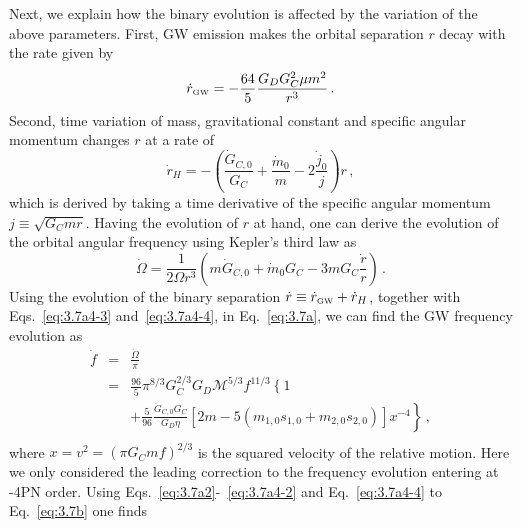 \documentclass[prd,twocolumn,nofootinbib]{revtex4-1}
\newcommand\bw{\begin{widetext}}
\newcommand\ew{\end{widetext}}
\newcommand{\GW}{{\mbox{\tiny GW}}}
\begin{document}
Next, we explain how the binary evolution is affected by the variation of the above parameters. 
First, GW emission makes the orbital separation $r$ decay with the rate given by~\cite{PhysRevD.49.2658}
 \begin{equation}
 \dot{r}_{\GW}=-\frac{64}{5}\frac{G_D G_C^2 \mu m^2}{r^3}\,.
 \end{equation}
Second, time variation of mass, gravitational constant and specific angular momentum changes $r$ at a rate of
 \begin{equation}
 \dot{r}_H=-\left(\frac{\dot{G}_{C,0}}{G_C}+\frac{\dot{m}_0}{m}-2\frac{\dot{j}_0}{j}\right)r\,,
 \end{equation}
 which is derived by taking a time derivative of the specific angular momentum $j\equiv\sqrt{G_Cmr}$. Having the evolution of $r$ at hand, one can derive the evolution of the orbital angular frequency using Kepler's third law as
 \begin{equation}\label{eq:3.7a}
 \dot{\Omega}=\frac{1}{2\Omega r^3}\left(m\dot{G}_{C,0}+\dot{m}_0G_C-3mG_C\frac{\dot{r}}{r}\right)\,.
 \end{equation}
Using the evolution of the binary separation $\dot{r}\equiv \dot{r}_{\GW}+\dot{r}_H$, together with Eqs.~\eqref{eq:3.7a4-3} and~\eqref{eq:3.7a4-4}, in Eq.~\eqref{eq:3.7a}, we can find the GW frequency evolution as
\allowdisplaybreaks
\begin{eqnarray} 
\label{eq:3.7b}
 \dot{f}&=&\frac{\dot{\Omega}}{\pi} \nonumber \\
 &=&\frac{96}{5}\pi^{8/3}G_C^{2/3}G_D\mathcal{M}^{5/3}f^{11/3}\left\{1 \right. \nonumber \\
 && \left. +\frac{5}{96}\frac{\dot{G}_{C,0} G_C}{G_D\eta}[2m-5(m_{1,0}s_{1,0}+m_{2,0}s_{2,0})] x^{-4}  \right\}\,, \nonumber \\
\end{eqnarray}
where $x=v^2=(\pi G_C  m f)^{2/3}$ is the squared velocity of the relative motion. Here we only considered the leading correction to the frequency evolution entering at -4PN order. Using Eqs.~\eqref{eq:3.7a2}-~\eqref{eq:3.7a4-2} and Eq.~\eqref{eq:3.7a4-4} to Eq.~\eqref{eq:3.7b} one finds
\end{document}
